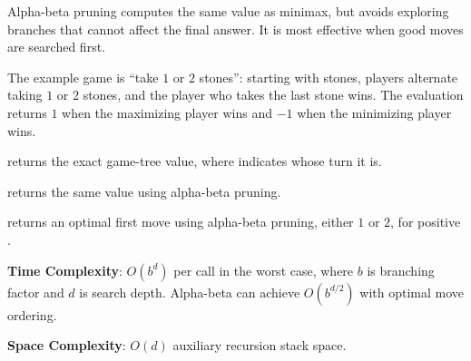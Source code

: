 Alpha-beta pruning computes the same value as minimax, but avoids exploring branches that cannot affect the final answer. It is most effective when good moves are searched first.

The example game is ``take $1$ or $2$ stones'': starting with  stones, players alternate taking $1$ or $2$ stones, and the player who takes the last stone wins. The evaluation returns $1$ when the maximizing player wins and $-1$ when the minimizing player wins.

\begin{compactitem}
  \item {} returns the exact game-tree value, where  indicates whose turn it is.
  \item {} returns the same value using alpha-beta pruning.
  \item {} returns an optimal first move using alpha-beta pruning, either $1$ or $2$, for positive .
\end{compactitem}

\textbf{Time Complexity}: $O(b^{d})$ per call in the worst case, where $b$ is branching factor and $d$ is search depth. Alpha-beta can achieve $O(b^{d/2})$ with optimal move ordering.

\textbf{Space Complexity}: $O(d)$ auxiliary recursion stack space.

